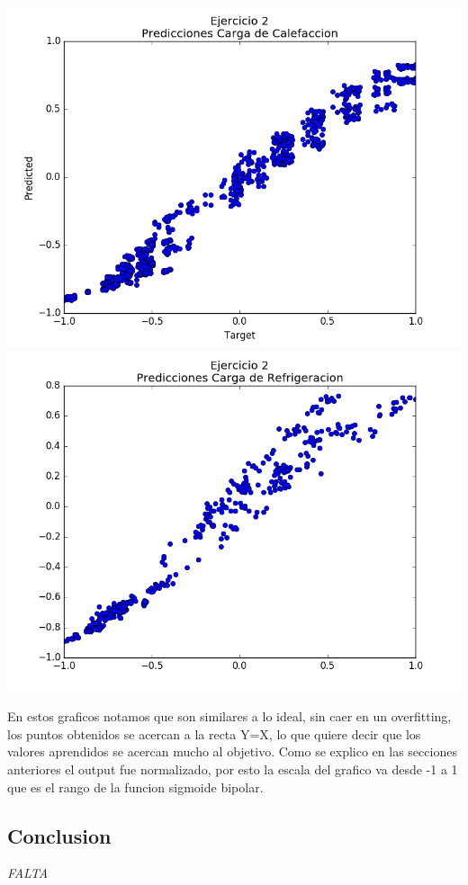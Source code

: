 \includegraphics[scale=0.4]{img/ej2-calef}
\includegraphics[scale=0.4]{img/ej2-refrig}


En estos graficos notamos que son similares a lo ideal, sin caer en un overfitting, los puntos obtenidos se acercan a la recta Y=X, lo que quiere decir que los valores aprendidos se acercan mucho al objetivo.
Como se explico en las secciones anteriores el output fue normalizado, por esto la escala del grafico va desde -1 a 1 que es el rango de la funcion sigmoide bipolar.

\subsection{Conclusion}

\emph{\color{red} FALTA }
